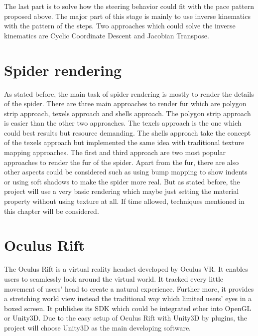 The last part is to solve how the steering behavior could fit with the pace pattern proposed above. The major part of this stage is mainly to use inverse kinematics with the pattern of the steps. Two approaches which could solve the inverse kinematics are Cyclic Coordinate Descent and Jacobian Transpose.
\section{Spider rendering}
As stated before, the main task of spider rendering is mostly to render the details of the spider. There are three main approaches to render fur which are polygon strip approach, texels approach and shells approach\cite{fur}. The polygon strip approach is easier than the other two approaches. The texels approach is the one which could best results but resource demanding. The shells approach take the concept of the texels approach but implemented the same idea with traditional texture mapping approaches\cite{fur}. The first and third approach are two most popular approaches to render the fur of the spider. Apart from the fur, there are also other aspects could be considered such as using bump mapping to show indents or using soft shadows to make the spider more real. But as stated before, the project will use a very basic rendering which maybe just setting the material property without using texture at all. If time allowed, techniques mentioned in this chapter will be considered.
\section{Oculus Rift}
The Oculus Rift is a virtual reality headset developed by Oculus VR. It enables users to seamlessly look around the virtual world. It tracked every little movement of users' head to create a natural experience. Further more, it provides a stretching world view instead the traditional way which limited users' eyes in a boxed screen.\cite{rift1}
It publishes its SDK which could be integrated ether into OpenGL or Unity3D. Due to the easy setup of Oculus Rift with Unity3D by plugins, the project will choose Unity3D as the main developing software.
